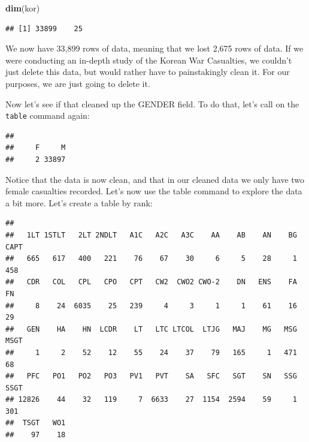 \documentclass[]{book}
\newenvironment{Shaded}{\begin{snugshade}}{\end{snugshade}}
\newcommand{\KeywordTok}[1]{\textcolor[rgb]{0.13,0.29,0.53}{\textbf{{#1}}}}
\newcommand{\NormalTok}[1]{{#1}}
\begin{document}
\begin{Shaded}
\begin{Highlighting}[]
\KeywordTok{dim}\NormalTok{(kor)}
\end{Highlighting}
\end{Shaded}

\begin{verbatim}
## [1] 33899    25
\end{verbatim}

We now have 33,899 rows of data, meaning that we lost 2,675 rows of
data. If we were conducting an in-depth study of the Korean War
Casualties, we couldn't just delete this data, but would rather have to
painstakingly clean it. For our purposes, we are just going to delete
it.

Now let's see if that cleaned up the GENDER field. To do that, let's
call on the \texttt{table} command again:

\begin{Shaded}
\end{Shaded}

\begin{verbatim}
## 
##     F     M 
##     2 33897
\end{verbatim}

Notice that the data is now clean, and that in our cleaned data we only
have two female casualties recorded. Let's now use the table command to
explore the data a bit more. Let's create a table by rank:

\begin{Shaded}
\end{Shaded}

\begin{verbatim}
## 
##   1LT 1STLT   2LT 2NDLT   A1C   A2C   A3C    AA    AB    AN    BG  CAPT 
##   665   617   400   221    76    67    30     6     5    28     1   458 
##   CDR   COL   CPL   CPO   CPT   CW2  CWO2 CWO-2    DN   ENS    FA    FN 
##     8    24  6035    25   239     4     3     1     1    61    16    29 
##   GEN    HA    HN  LCDR    LT   LTC LTCOL  LTJG   MAJ    MG   MSG  MSGT 
##     1     2    52    12    55    24    37    79   165     1   471    68 
##   PFC   PO1   PO2   PO3   PV1   PVT    SA   SFC   SGT    SN   SSG  SSGT 
## 12826    44    32   119     7  6633    27  1154  2594    59     1   301 
##  TSGT   WO1 
##    97    18
\end{verbatim}
\end{document}
